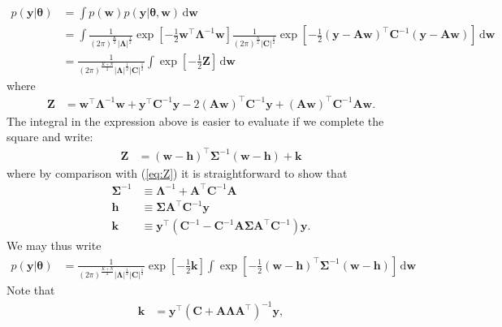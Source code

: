 \documentclass{rnaastex}
\newcommand{\dd}{\ensuremath{\,\mathrm{d}}}
\newcommand{\bvec}[1]{{\ensuremath{\boldsymbol{#1}}}}
\newcommand{\Gaussian}[3]{\ensuremath{\frac{1}{(2\pi)^\frac{#3}{2}|#2|^\frac{1}{2}} 
            \exp\left[ -\frac{1}{2}#1^\top #2^{-1} #1 \right]}}
\begin{document}
\begin{align}
\label{eq:integral}
p(\bvec{y} | \bvec{\theta}) &= 
    \int p(\bvec{w}) p(\bvec{y} | \bvec{\theta}, \bvec{w}) \dd\bvec{w} 
    \nonumber \\
%
&= \int \Gaussian{\bvec{w}}{\bvec{\Lambda}}{K} 
        \Gaussian{(\bvec{y} - \bvec{A}\bvec{w})}{\bvec{C}}{N} 
        \dd\bvec{w} \nonumber \\
%
&= \frac{1}{(2\pi)^\frac{K+N}{2}
        |\bvec{\Lambda}|^\frac{1}{2}
        |\bvec{C}|^\frac{1}{2}} 
   \int \exp\left[ -\frac{1}{2} \bvec{Z} \right] \dd\bvec{w}
\end{align}
%
where
%
\begin{align}
\label{eq:Z}
\bvec{Z} &= \bvec{w}^\top\bvec{\Lambda}^{-1}\bvec{w} + 
            \bvec{y}^\top\bvec{C}^{-1}\bvec{y} -
            2(\bvec{A}\bvec{w})^\top \bvec{C}^{-1} \bvec{y} +
            (\bvec{A}\bvec{w})^\top \bvec{C}^{-1} \bvec{A}\bvec{w}.
\end{align}
%
The integral in the expression above is easier to evaluate if we 
complete the square and write:
%
\begin{align}
\label{eq:Z_square}
\bvec{Z} &= (\bvec{w} - \bvec{h})^\top \bvec{\Sigma}^{-1} 
            (\bvec{w} - \bvec{h}) + \bvec{k}
\end{align}
%
where by comparison with (\ref{eq:Z}) it is straightforward to show that
%
\begin{align}
\bvec{\Sigma}^{-1} &\equiv \bvec{\Lambda}^{-1} + 
                           \bvec{A}^\top \bvec{C}^{-1} \bvec{A} \\
%
\bvec{h} &\equiv \bvec{\Sigma}\bvec{A}^\top \bvec{C}^{-1} \bvec{y} \\
%
\bvec{k} &\equiv \bvec{y}^\top 
            \left( 
            \bvec{C}^{-1} - 
            \bvec{C}^{-1} \bvec{A} \bvec{\Sigma} \bvec{A}^\top \bvec{C}^{-1}
            \right) \bvec{y}.
\end{align}
We may thus write
%
\begin{align}
p(\bvec{y} | \bvec{\theta}) &= 
        \frac{1}{(2\pi)^\frac{K+N}{2}
        |\bvec{\Lambda}|^\frac{1}{2}
        |\bvec{C}|^\frac{1}{2}} 
    \exp
    \left[
        -\frac{1}{2} 
        \bvec{k}
    \right]
   \int \exp
        \left[ 
            -\frac{1}{2} 
            (\bvec{w} - \bvec{h})^\top \bvec{\Sigma}^{-1} (\bvec{w} - \bvec{h})
        \right]
     \dd\bvec{w}
\end{align}
%
%
%
Note that
\begin{align}
\bvec{k} &= \bvec{y}^\top 
            \left( 
            \bvec{C} + \bvec{A}\bvec{\Lambda}\bvec{A}^\top
            \right)^{-1} 
            \bvec{y},
\end{align}


\end{document}
